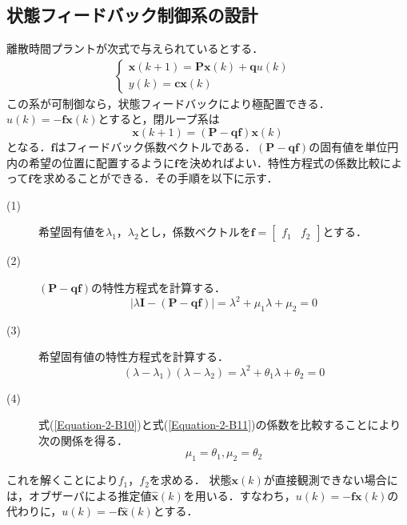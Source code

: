 \documentclass[12pt]{jsarticle}
\begin{document}
\subsection{状態フィードバック制御系の設計}
離散時間プラントが次式で与えられているとする．
\begin{eqnarray}
  \label{Equation-2-B8}
  \begin{cases}
  {\bm x}(k+1) = {\bm P}{\bm x}(k) + {\bm q}u(k) & \\
  y(k) = {\bm c}{\bm x}(k) &
  \end{cases}
\end{eqnarray}
この系が可制御なら，状態フィードバックにより極配置できる．
$u(k)=-{\bm f}{\bm x}(k)$とすると，閉ループ系は
\begin{equation}
  \label{Equation-2-B9}
  {\bm x}(k+1) = ({\bm P} - {\bm q}{\bm f}){\bm x}(k)
\end{equation}
となる．$\bm f$はフィードバック係数ベクトルである．$({\bm P}-{\bm q}{\bm f})$の固有値を単位円内の希望の位置に配置するように$\bm f$を決めればよい．特性方程式の係数比較によって$\bm f$を求めることができる．その手順を以下に示す．
\begin{description}
  \item[(1)] 希望固有値を$\lambda_1$，$\lambda_2$とし，係数ベクトルを${\bm f}=\left[\begin{array}{cc}f_1&f_2\end{array}\right]$とする．
  \item[(2)] $({\bm P}-{\bm q}{\bm f})$の特性方程式を計算する．
    \begin{equation}
      \label{Equation-2-B10}
      |\lambda {\bm I} - ({\bm P}-{\bm q}{\bm f})| = \lambda^2 + \mu_1 \lambda + \mu_2 = 0
    \end{equation}
  \item[(3)] 希望固有値の特性方程式を計算する．
    \begin{equation}
      \label{Equation-2-B11}
      (\lambda - \lambda_1)(\lambda - \lambda_2) = \lambda^2 + \theta_1 \lambda + \theta_2 = 0
    \end{equation}
  \item[(4)] 式(\ref{Equation-2-B10})と式(\ref{Equation-2-B11})の係数を比較することにより次の関係を得る．
    \begin{equation}
      \label{Equation-2-B12}
      \mu_1 = \theta_1,  \mu_2 = \theta_2
    \end{equation}
\end{description}
これを解くことにより$f_1$，$f_2$を求める．
状態${\bm x}(k)$が直接観測できない場合には，オブザーバによる推定値$\hat{\bm x}(k)$を用いる．すなわち，$u(k)=-{\bm f}{\bm x}(k)$の代わりに，$u(k)=-{\bm f}\hat{\bm x}(k)$とする．
\end{document}
